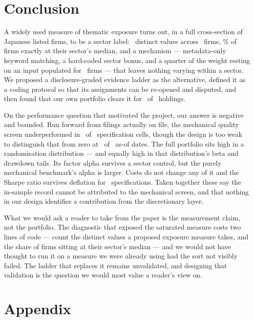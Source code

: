 \documentclass[a4paper,11pt]{article}
\begin{document}
\section{Conclusion}\label{sec:conclusion}

A widely used measure of thematic exposure turns out, in a full cross-section of Japanese listed
firms, to be a sector label: \SatDistinct\ distinct values across \SatFirms\ firms,
\SatSectorShare\% of firms exactly at their sector's median, and a mechanism ---
metadata-only keyword matching, a hard-coded sector bonus, and a quarter of the weight resting on an
input populated for \SatRdPresent\ firms --- that leaves nothing varying within a sector. We proposed a
disclosure-graded evidence ladder as the alternative, defined it as a coding protocol so that its
assignments can be re-opened and disputed, and then found that our own portfolio clears it for
\OwnVerified\ of \OwnHoldings\ holdings.

On the performance question that motivated the project, our answer is negative and bounded. Run
forward from filings actually on file, the mechanical quality screen underperformed in
\LoneNegative\ of \LoneCells\ specification cells, though the design is too weak to distinguish that
from zero at \MdeNotDetectable\ of \MdeTotal\ as-of dates. The full portfolio sits high in a randomisation
distribution --- and equally high in that distribution's beta and drawdown tails. Its factor alpha
survives a sector control, but the purely mechanical benchmark's alpha is larger. Costs do not change
any of it and the Sharpe ratio survives deflation for \SpecTotal\ specifications. Taken together these
say the in-sample record cannot be attributed to the mechanical screen, and that nothing in our design
identifies a contribution from the discretionary layer.

What we would ask a reader to take from the paper is the measurement claim, not the portfolio. The
diagnostic that exposed the saturated measure costs two lines of code --- count the distinct values a
proposed exposure measure takes, and the share of firms sitting at their sector's median --- and we
would not have thought to run it on a measure we were already using had the sort not visibly failed.
The ladder that replaces it remains unvalidated, and designing that validation is the question we
would most value a reader's view on.


\appendix
\section*{Appendix}

\end{document}
